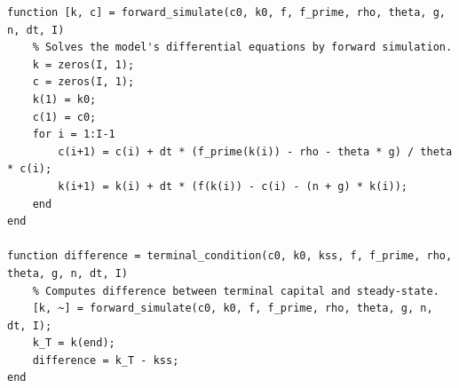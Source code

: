 \documentclass{article}
\begin{document}
\begin{lstlisting}
function [k, c] = forward_simulate(c0, k0, f, f_prime, rho, theta, g, n, dt, I)
    % Solves the model's differential equations by forward simulation.
    k = zeros(I, 1);
    c = zeros(I, 1);
    k(1) = k0;
    c(1) = c0;
    for i = 1:I-1
        c(i+1) = c(i) + dt * (f_prime(k(i)) - rho - theta * g) / theta * c(i);
        k(i+1) = k(i) + dt * (f(k(i)) - c(i) - (n + g) * k(i));
    end
end

function difference = terminal_condition(c0, k0, kss, f, f_prime, rho, theta, g, n, dt, I)
    % Computes difference between terminal capital and steady-state.
    [k, ~] = forward_simulate(c0, k0, f, f_prime, rho, theta, g, n, dt, I);
    k_T = k(end);
    difference = k_T - kss;
end
\end{lstlisting}
\end{document}

